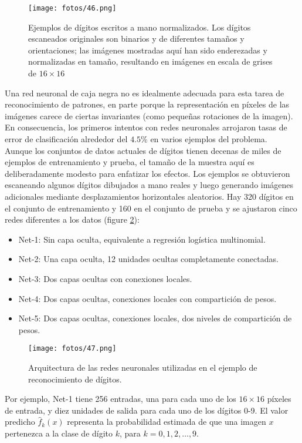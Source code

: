 \begin{figure}[h]
\centering
\texttt{[image: fotos/46.png]}
\caption{Ejemplos de dígitos escritos a mano normalizados. Los dígitos escaneados originales son binarios y de diferentes tamaños y orientaciones; las imágenes mostradas aquí han sido enderezadas y normalizadas en tamaño, resultando en imágenes en escala de grises de $16 \times 16$}
\label{fig:7.7}
\end{figure}

Una red neuronal de caja negra no es idealmente adecuada para esta tarea de reconocimiento de patrones, en parte porque la representación en píxeles de las imágenes carece de ciertas invariantes (como pequeñas rotaciones de la imagen). En consecuencia, los primeros intentos con redes neuronales arrojaron tasas de error de clasificación alrededor del $4.5$\% en varios ejemplos del problema. \\

Aunque los conjuntos de datos actuales de dígitos tienen decenas de miles de ejemplos de entrenamiento y prueba, el tamaño de la muestra aquí es deliberadamente modesto para enfatizar los efectos. Los ejemplos se obtuvieron escaneando algunos dígitos dibujados a mano reales y luego generando imágenes adicionales mediante desplazamientos horizontales aleatorios. Hay 320 dígitos en el conjunto de entrenamiento y 160 en el conjunto de prueba y se ajustaron cinco redes diferentes a los datos (figure \ref{fig:7.8}):
\begin{itemize}
\item Net-1: Sin capa oculta, equivalente a regresión logística multinomial.
\item Net-2: Una capa oculta, 12 unidades ocultas completamente conectadas.
\item Net-3: Dos capas ocultas con conexiones locales.
\item Net-4: Dos capas ocultas, conexiones locales con compartición de pesos.
\item Net-5: Dos capas ocultas, conexiones locales, dos niveles de compartición de pesos.
\end{itemize}

\begin{figure}[h]
\centering
\texttt{[image: fotos/47.png]}
\caption{Arquitectura de las redes neuronales utilizadas en el ejemplo de reconocimiento de dígitos.}
\label{fig:7.8}
\end{figure}

Por ejemplo, Net-1 tiene 256 entradas, una para cada uno de los $16 \times 16$ píxeles de entrada, y diez unidades de salida para cada uno de los dígitos 0-9. El valor predicho $\hat{f}_k(x)$ representa la probabilidad estimada de que una imagen $x$ pertenezca a la clase de dígito $k$, para $k = 0, 1, 2, \dots, 9$. \\

